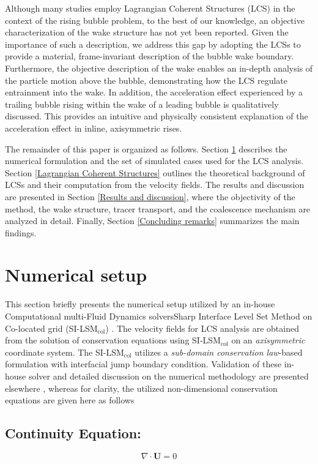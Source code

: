 \documentclass[aps,prfluids,reprint,nofootinbib,onecolumn,groupedaddress,showkeys]{revtex4-2}
\begin{document}
	Although many studies employ Lagrangian Coherent Structures (LCS) in the context of the rising bubble problem, to the best of our knowledge, an objective characterization of the wake structure has not yet been reported. Given the importance of such a description, we address this gap by adopting the LCSs to provide a material, frame-invariant description of the bubble wake boundary. Furthermore, the objective description of the wake enables an in-depth analysis of the particle motion above the bubble, demonstrating how the LCS regulate entrainment into the wake. In addition, the acceleration effect experienced by a trailing bubble rising within the wake of a leading bubble is qualitatively discussed. This provides an intuitive and physically consistent explanation of the acceleration effect {\color{black}in inline, axisymmetric} rises.
	
	The remainder of this paper is organized as follows. Section \ref{Numerical setup} describes the numerical formulation and the set of simulated cases used for the LCS analysis. Section \ref{Lagrangian Coherent Structures} outlines the theoretical background of LCSs and their computation from the velocity fields. The results and discussion are presented in Section \ref{Results and discussion}, where the objectivity of the method, the wake structure, tracer transport, and the coalescence mechanism are analyzed in detail. Finally, Section \ref{Concluding remarks} summarizes the main findings.
	
	\section{Numerical setup}
	\label{Numerical setup}
	\label{Mathematical formulation}
	This section briefly presents the numerical setup utilized by an in-house Computational multi-Fluid Dynamics solvers\textemdash Sharp Interface Level Set Method on Co-located grid (SI-LSM$_{\text{col}}$) \cite{Chirammel2023}. The velocity fields for LCS analysis are obtained from the solution of conservation equations using SI-LSM$_{\text{col}}$ on an \textit{axisymmetric} coordinate system. The SI-LSM$_{\text{col}}$ utilizes a \textit{sub-domain conservation law}-based formulation with interfacial jump boundary condition. Validation of these in-house solver and detailed discussion on the numerical methodology are presented elsewhere \cite{Chirammel2023}, whereas for clarity, the utilized non-dimensional conservation equations are given here as follows
	\subsection*{Continuity Equation:}
	\begin{equation}\label{eqt:continuity}
		\nabla\cdot\mathbf{U}=0
	\end{equation}
\end{document}
